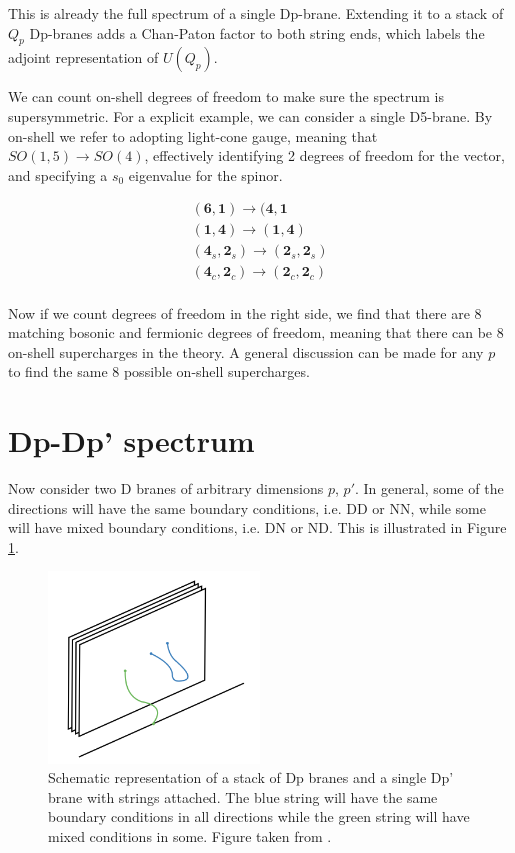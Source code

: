 This is already the full spectrum of a single Dp-brane. Extending it to a stack of $Q_p$ Dp-branes adds a Chan-Paton factor to both string ends, which labels the adjoint representation of $U(Q_p)$. 

We can count on-shell degrees of freedom to make sure the spectrum is supersymmetric. For a explicit example, we can consider a single D5-brane. By on-shell we refer to adopting light-cone gauge, meaning that $SO(1,5) \rightarrow SO(4)$, effectively identifying 2 degrees of freedom for the vector, and specifying a $s_0$ eigenvalue for the spinor.

\begin{align*}
    (\mathbf{6},\mathbf{1}) \rightarrow (\mathbf{4},\mathbf{1}\\
    (\mathbf{1},\mathbf{4}) \rightarrow (\mathbf{1}, \mathbf{4})\\
    (\mathbf{4}_s,\mathbf{2}_s) \rightarrow (\mathbf{2}_s,\mathbf{2}_s) \\
    (\mathbf{4}_c,\mathbf{2}_c) \rightarrow (\mathbf{2}_c,\mathbf{2}_c) \\
\end{align*}

Now if we count degrees of freedom in the right side, we find that there are 8 matching bosonic and fermionic degrees of freedom, meaning that there can be 8 on-shell supercharges in the theory. A general discussion can be made for any $p$ to find the same 8 possible on-shell supercharges. 

\section{Dp-Dp' spectrum}


Now consider two D branes of arbitrary dimensions $p$, $p'$. In general, some of the directions will have the same boundary conditions, i.e. DD or NN, while some will have mixed boundary conditions, i.e. DN or ND. This is illustrated in Figure \ref{fig:brane-schematic}.


\begin{figure}[htbp]
    \centering
    \includegraphics[width=0.5\textwidth]{IMAGES/brane-strings.png}
    \caption{Schematic representation of a stack of Dp branes and a single Dp' brane with strings attached. The blue string will have the same boundary conditions in all directions while the green string will have mixed conditions in some. Figure taken from \cite{Stemerdink:2022hnf}.}
    \label{fig:brane-schematic}
\end{figure}

